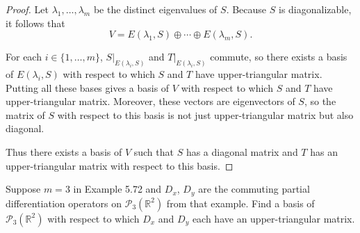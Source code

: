 \begin{proof}
    Let $\lambda_{1}, \ldots, \lambda_{m}$ be the distinct eigenvalues of $S$. Because $S$ is diagonalizable, it follows that
    \[
        V = E(\lambda_{1}, S) \oplus \cdots \oplus E(\lambda_{m}, S).
    \]

    For each $i\in\{1, \ldots, m\}$, $S\vert_{E(\lambda_{i}, S)}$ and $T\vert_{E(\lambda_{i}, S)}$ commute, so there exists a basis of $E(\lambda_{i}, S)$ with respect to which $S$ and $T$ have upper-triangular matrix. Putting all these bases gives a basis of $V$ with respect to which $S$ and $T$ have upper-triangular matrix. Moreover, these vectors are eigenvectors of $S$, so the matrix of $S$ with respect to this basis is not just upper-triangular matrix but also diagonal.

    Thus there exists a basis of $V$ such that $S$ has a diagonal matrix and $T$ has an upper-triangular matrix with respect to this basis.
\end{proof}
\newpage

\begin{exercise}
    Suppose $m = 3$ in Example 5.72 and $D_{x}$, $D_{y}$ are the commuting partial
    differentiation operators on $\mathscr{P}_{3}(\mathbb{R}^{2})$ from that example. Find a basis of $\mathscr{P}_{3}(\mathbb{R}^{2})$ with respect to which $D_{x}$ and $D_{y}$ each have an upper-triangular matrix.
\end{exercise}

